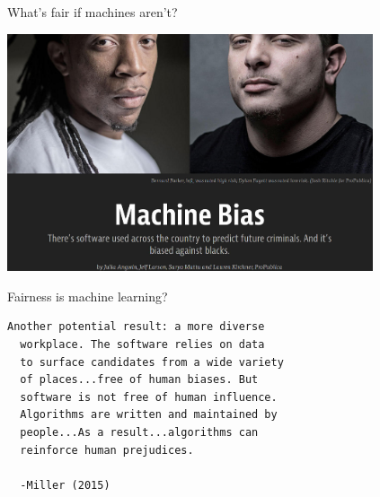 \documentclass[12pt,t]{beamer}
\begin{document}

\begin{frame}[fragile,c]{What's fair if machines aren't?}

\begin{center}
\includegraphics[height=70mm]{Figs/propublica.jpg}
\end{center}

\note{
}

\end{frame}


\begin{frame}[fragile,c]{Fairness is machine learning?}

\begin{center}
\begin{minipage}[c]{11.25cm}
\begin{semiverbatim}
\lstset{basicstyle=\normalsize}
\begin{lstlisting}[linewidth=11.25cm]
  Another potential result: a more diverse
  workplace. The software relies on data
  to surface candidates from a wide variety
  of places...free of human biases. But
  software is not free of human influence.
  Algorithms are written and maintained by
  people...As a result...algorithms can
  reinforce human prejudices.

  -Miller (2015)
\end{lstlisting}
\end{semiverbatim}
\end{minipage}
\end{center}


\end{frame}
\end{document}

